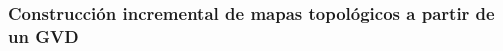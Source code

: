 


\subsubsection{Construcción incremental de mapas topológicos a partir de un GVD}
\cite{Liu2015}











